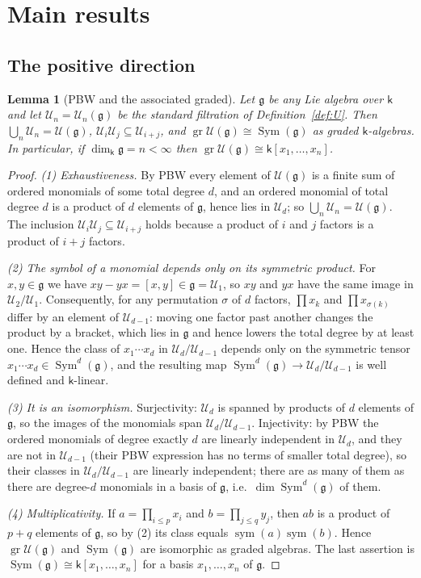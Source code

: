 \documentclass[11pt]{ctexart}
\theoremstyle{plain}
\newtheorem{lemma}[theorem]{Lemma}
\theoremstyle{definition}
\theoremstyle{remark}
\newcommand{\kk}{\mathsf{k}}
\newcommand{\gl}{\mathfrak{g}}
\newcommand{\UU}{\mathcal{U}}
\newcommand{\Sym}{\operatorname{Sym}}
\begin{document}
\section{Main results}\label{sec:main}

\subsection{The positive direction}

\begin{lemma}[PBW and the associated graded]\label{lem:pbw}
Let $\gl$ be any Lie algebra over $\kk$ and let $\UU_n=\UU_n(\gl)$ be the standard
filtration of Definition~\ref{def:U}. Then $\bigcup_n\UU_n=\UU(\gl)$,
$\UU_i\UU_j\subseteq\UU_{i+j}$, and $\operatorname{gr}\UU(\gl)\cong\Sym(\gl)$ as
graded $\kk$-algebras. In particular, if $\dim_\kk\gl=n<\infty$ then
$\operatorname{gr}\UU(\gl)\cong\kk[x_1,\dots,x_n]$.
\end{lemma}

\begin{proof}
\emph{(1) Exhaustiveness.} By PBW every element of $\UU(\gl)$ is a finite sum of
ordered monomials of some total degree $d$, and an ordered monomial of total degree
$d$ is a product of $d$ elements of $\gl$, hence lies in $\UU_d$; so
$\bigcup_n\UU_n=\UU(\gl)$. The inclusion $\UU_i\UU_j\subseteq\UU_{i+j}$ holds because
a product of $i$ and $j$ factors is a product of $i+j$ factors.

\emph{(2) The symbol of a monomial depends only on its symmetric product.} For
$x,y\in\gl$ we have $xy-yx=[x,y]\in\gl=\UU_1$, so $xy$ and $yx$ have the same image
in $\UU_2/\UU_1$. Consequently, for any permutation $\sigma$ of $d$ factors,
$\prod x_k$ and $\prod x_{\sigma(k)}$ differ by an element of $\UU_{d-1}$: moving one
factor past another changes the product by a bracket, which lies in $\gl$ and hence
lowers the total degree by at least one. Hence the class of
$x_1\cdots x_d$ in $\UU_d/\UU_{d-1}$ depends only on the symmetric tensor
$x_1\cdots x_d\in\Sym^d(\gl)$, and the resulting map
$\Sym^d(\gl)\to\UU_d/\UU_{d-1}$ is well defined and $\kk$-linear.

\emph{(3) It is an isomorphism.} Surjectivity: $\UU_d$ is spanned by products of $d$
elements of $\gl$, so the images of the monomials span $\UU_d/\UU_{d-1}$.
Injectivity: by PBW the ordered monomials of degree exactly $d$ are linearly
independent in $\UU_d$, and they are not in $\UU_{d-1}$ (their PBW expression has no
terms of smaller total degree), so their classes in $\UU_d/\UU_{d-1}$ are linearly
independent; there are as many of them as there are degree-$d$ monomials in a basis
of $\gl$, i.e.\ $\dim\Sym^d(\gl)$ of them.

\emph{(4) Multiplicativity.} If $a=\prod_{i\le p}x_i$ and $b=\prod_{j\le q}y_j$, then
$ab$ is a product of $p+q$ elements of $\gl$, so by (2) its class equals
$\operatorname{sym}(a)\operatorname{sym}(b)$. Hence $\operatorname{gr}\UU(\gl)$ and
$\Sym(\gl)$ are isomorphic as graded algebras. The last assertion is
$\Sym(\gl)\cong\kk[x_1,\dots,x_n]$ for a basis $x_1,\dots,x_n$ of $\gl$.
\end{proof}
\end{document}
